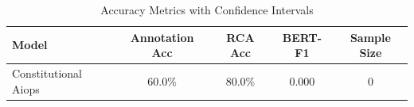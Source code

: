 
\begin{table}[h]
\centering
\caption{Accuracy Metrics with Confidence Intervals}
\label{tab:accuracy}
\begin{tabular}{lcccc}
\toprule
\textbf{Model} & \textbf{Annotation Acc} & \textbf{RCA Acc} & \textbf{BERT-F1} & \textbf{Sample Size} \\
\midrule
Constitutional Aiops & 60.0\% & 80.0\% & 0.000 & 0 \\

\bottomrule
\end{tabular}
\end{table}
